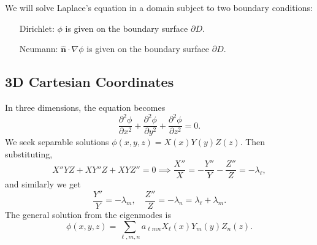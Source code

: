 \documentclass[12pt]{article}
\begin{document}
We will solve Laplace's equation in a domain subject to two boundary conditions:
\begin{itemize}
	\item[Dirichlet:] $\phi$ is given on the boundary surface $\partial D$.
	\item[Neumann:] $\mathbf{\hat n} \cdot \nabla \phi$ is given on the boundary surface $\partial D$.
\end{itemize}

\subsection{3D Cartesian Coordinates}%
\label{sub:3d_cartesian_coordinates}

In three dimensions, the equation becomes
\[
\frac{\partial^2 \phi}{\partial x^2} + \frac{\partial^2 \phi}{\partial y^2} + \frac{\partial^2 \phi}{\partial z^2} = 0
.\]
We seek separable solutions $\phi(x, y, z) = X(x)Y(y)Z(z)$. Then substituting,
\[
X''YZ + XY''Z + XYZ'' = 0 \implies \frac{X''}{X} = - \frac{Y''}{Y} - \frac{Z''}{Z} = - \lambda_{\ell}
,\]
and similarly we get
\[
\frac{Y''}{Y} = -\lambda_m, \quad \frac{Z''}{Z} = - \lambda_n = \lambda_{\ell} + \lambda_m
.\]
The general solution from the eigenmodes is
\[
	\phi(x, y, z) = \sum_{\ell, m, n} a_{\ell m n} X_{\ell}(x)Y_m(y)Z_n(z)
.\]
\end{document}
